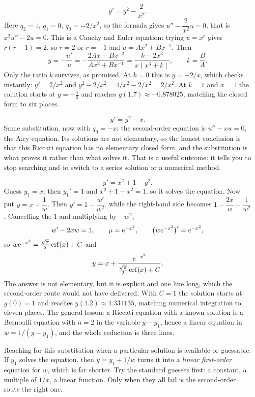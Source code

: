 \begin{worked}
\[y'=y^{2}-\frac{2}{x^{2}}.\]
Here $q_2=1$, $q_1=0$, $q_0=-2/x^{2}$, so the formula gives $u''-\dfrac{2}{x^{2}}u=0$, that is $x^{2}u''-2u=0$. This is a Cauchy and Euler equation: trying $u=x^{r}$ gives $r(r-1)=2$, so $r=2$ or $r=-1$ and $u=Ax^{2}+Bx^{-1}$. Then
\[y=-\frac{u'}{u}=-\frac{2Ax-Bx^{-2}}{Ax^{2}+Bx^{-1}}=\frac{k-2x^{3}}{x(x^{3}+k)},\qquad k=\frac{B}{A}.\]
Only the ratio $k$ survives, as promised. At $k=0$ this is $y=-2/x$, which checks instantly: $y'=2/x^{2}$ and $y^{2}-2/x^{2}=4/x^{2}-2/x^{2}=2/x^{2}$. At $k=1$ and $x=1$ the solution starts at $y=-\tfrac12$ and reaches $y(1.7)\approx-0.878025$, matching the closed form to six places.
\end{worked}

\begin{worked}
\[y'=y^{2}-x.\]
Same substitution, now with $q_0=-x$: the second-order equation is $u''-xu=0$, the Airy equation. Its solutions are not elementary, so the honest conclusion is that this Riccati equation has no elementary closed form, and the substitution is what proves it rather than what solves it. That is a useful outcome: it tells you to stop searching and to switch to a series solution or a numerical method.
\end{worked}

\begin{worked}
\[y'=x^{2}+1-y^{2}.\]
Guess $y_1=x$: then $y_1'=1$ and $x^{2}+1-x^{2}=1$, so it solves the equation. Now put $y=x+\dfrac{1}{w}$. Then $y'=1-\dfrac{w'}{w^{2}}$, while the right-hand side becomes $1-\dfrac{2x}{w}-\dfrac{1}{w^{2}}$. Cancelling the $1$ and multiplying by $-w^{2}$,
\[w'-2xw=1,\qquad \mu=\mathrm{e}^{-x^{2}},\qquad \bigl(w\mathrm{e}^{-x^{2}}\bigr)'=\mathrm{e}^{-x^{2}},\]
so $w\mathrm{e}^{-x^{2}}=\tfrac{\sqrt{\pi}}{2}\operatorname{erf}(x)+C$ and
\[y=x+\frac{\mathrm{e}^{-x^{2}}}{\tfrac{\sqrt{\pi}}{2}\operatorname{erf}(x)+C}.\]
The answer is not elementary, but it is explicit and one line long, which the second-order route would not have delivered. With $C=1$ the solution starts at $y(0)=1$ and reaches $y(1.2)\approx1.331135$, matching numerical integration to eleven places. The general lesson: a Riccati equation with a known solution is a Bernoulli equation with $n=2$ in the variable $y-y_1$, hence a linear equation in $w=1/(y-y_1)$, and the whole reduction is three lines.
\end{worked}

\begin{trap}
Reaching for this substitution when a particular solution is available or guessable. If $y_1$ solves the equation, then $y=y_1+1/w$ turns it into a \emph{linear first-order} equation for $w$, which is far shorter. Try the standard guesses first: a constant, a multiple of $1/x$, a linear function. Only when they all fail is the second-order route the right one.
\end{trap}

